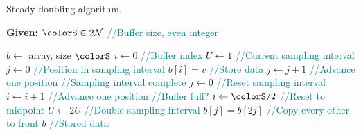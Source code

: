 \begin{algorithm}[H]
\caption{Steady doubling algorithm.}
\label{alg:steady-doubling}
\begin{minipage}{0.5\textwidth}
    \hspace*{\algorithmicindent} \textbf{Given:} $\colorS \in 2\mathcal{N}$ \textcolor{teal}{\small//Buffer size, even integer}
    \hspace*{\algorithmicindent}    \begin{algorithmic}[1]
        \State $b \gets$ array, size $\colorS$
        \State $i \gets 0$ \textcolor{teal}{\small//Buffer index}
        \State $U \gets 1$ \textcolor{teal}{\small//Current sampling interval}
        \State $j \gets 0$ \textcolor{teal}{\small//Position in sampling interval}
        \State $b[i] = v$ \textcolor{teal}{\small//Store data}
        \State $j \gets j + 1$  \textcolor{teal}{\small//Advance one position}
          \textcolor{teal}{\small//Sampling interval complete}
        \State $j \gets 0$  \textcolor{teal}{\small//Reset sampling interval}
        \State $i \gets i + 1$  \textcolor{teal}{\small//Advance one position}
         \textcolor{teal}{\small//Buffer full?}
        \State $i \gets \colorS / 2$ \textcolor{teal}{\small//Reset to midpoint}
        \State $U \gets 2U$ \textcolor{teal}{\small//Double sampling interval}
        \For{$j \in [0\twodots \colorS/2)$}
        \State $b[j] = b[2j]$ \textcolor{teal}{\small//Copy every other to front}
        \EndFor
        \EndIf
        \EndIf
        \EndFor
        \Return $b$ \textcolor{teal}{\small//Stored data}
    \end{algorithmic}
\end{minipage}
\end{algorithm}
